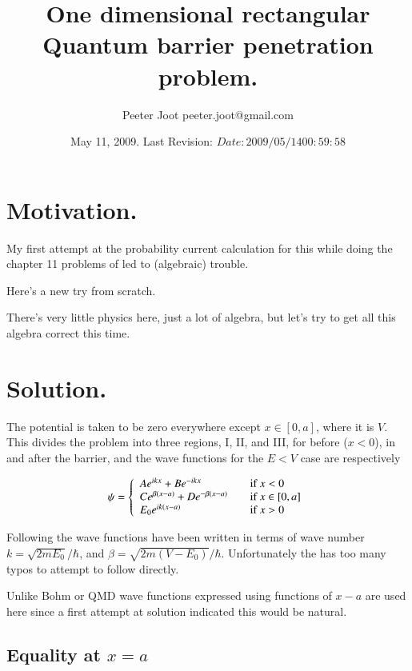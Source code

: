\documentclass{article}
\title{ One dimensional rectangular Quantum barrier penetration problem. }
\author{Peeter Joot \quad peeter.joot@gmail.com }
\date{ May 11, 2009.  Last Revision: $Date: 2009/05/14 00:59:58 $ }
\begin{document}
\maketitle{}
\tableofcontents
\section{ Motivation. }

My first attempt at the probability current calculation for this
while doing the chapter 11 problems of \cite{bohm1989qt} led to (algebraic) trouble.

Here's a new try from scratch.

There's very little physics here, just a lot of algebra, but let's try
to get all this algebra correct this time.

\section{ Solution. }

The potential is taken to be zero everywhere except $x \in [0,a]$, where it is
$V$.  This divides the problem into three regions, I, II, and III, for 
before ($x<0$), in and after the barrier, and the wave functions for the 
$E <V$ case are respectively

\begin{equation}
\psi =
\left\{
\begin{array}{l l}
A e^{i k x} + B e^{-i k x} & \quad \mbox{if $x <0$} \\
C e^{ \beta(x-a)} + D e^{ -\beta(x-a)} & \quad \mbox{if $x \in [0,a]$} \\
E_0 e^{i k(x-a)} & \quad \mbox{if $x >0$} \\
\end{array}
\right.
\end{equation}

Following \cite{mcmahon2005qmd} the wave functions have been written in terms of wave number 
$k = \sqrt{2 m E_0}/\hbar$, and $\beta = \sqrt{2 m (V-E_0)}/\hbar$.  Unfortunately the 
\cite{mcmahon2005qmd} has too many typos to attempt to follow directly.

Unlike Bohm or QMD wave functions expressed using functions of $x-a$ are used here since a first
attempt at solution indicated this would be natural.

\subsection{ Equality at $x=a$ }
\end{document}
